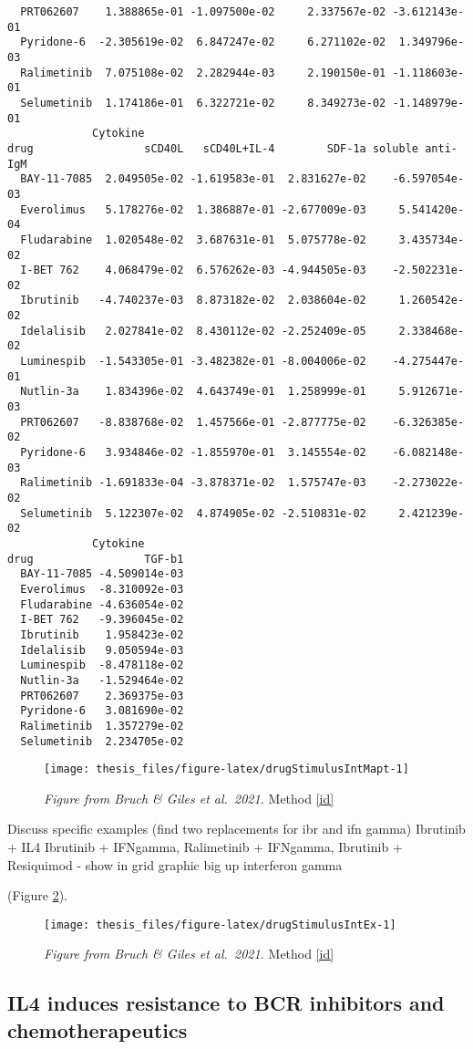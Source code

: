 \documentclass[11pt, a4paper, twosided]{book}
\begin{document}
\begin{verbatim}
  PRT062607    1.388865e-01 -1.097500e-02     2.337567e-02 -3.612143e-01
  Pyridone-6  -2.305619e-02  6.847247e-02     6.271102e-02  1.349796e-03
  Ralimetinib  7.075108e-02  2.282944e-03     2.190150e-01 -1.118603e-01
  Selumetinib  1.174186e-01  6.322721e-02     8.349273e-02 -1.148979e-01
             Cytokine
drug                 sCD40L   sCD40L+IL-4        SDF-1a soluble anti-IgM
  BAY-11-7085  2.049505e-02 -1.619583e-01  2.831627e-02    -6.597054e-03
  Everolimus   5.178276e-02  1.386887e-01 -2.677009e-03     5.541420e-04
  Fludarabine  1.020548e-02  3.687631e-01  5.075778e-02     3.435734e-02
  I-BET 762    4.068479e-02  6.576262e-03 -4.944505e-03    -2.502231e-02
  Ibrutinib   -4.740237e-03  8.873182e-02  2.038604e-02     1.260542e-02
  Idelalisib   2.027841e-02  8.430112e-02 -2.252409e-05     2.338468e-02
  Luminespib  -1.543305e-01 -3.482382e-01 -8.004006e-02    -4.275447e-01
  Nutlin-3a    1.834396e-02  4.643749e-01  1.258999e-01     5.912671e-03
  PRT062607   -8.838768e-02  1.457566e-01 -2.877775e-02    -6.326385e-02
  Pyridone-6   3.934846e-02 -1.855970e-01  3.145554e-02    -6.082148e-03
  Ralimetinib -1.691833e-04 -3.878371e-02  1.575747e-03    -2.273022e-02
  Selumetinib  5.122307e-02  4.874905e-02 -2.510831e-02     2.421239e-02
             Cytokine
drug                 TGF-b1
  BAY-11-7085 -4.509014e-03
  Everolimus  -8.310092e-03
  Fludarabine -4.636054e-02
  I-BET 762   -9.396045e-02
  Ibrutinib    1.958423e-02
  Idelalisib   9.050594e-03
  Luminespib  -8.478118e-02
  Nutlin-3a   -1.529464e-02
  PRT062607    2.369375e-03
  Pyridone-6   3.081690e-02
  Ralimetinib  1.357279e-02
  Selumetinib  2.234705e-02
\end{verbatim}
\begin{figure}

{\centering \texttt{[image: thesis\_files/figure-latex/drugStimulusIntMapt-1]} 

}

\caption{\emph{Figure from Bruch \& Giles et al.~2021.} Method \ref{id}}\label{fig:drugStimulusIntMapt}
\end{figure}
Discuss specific examples
(find two replacements for ibr and ifn gamma)
Ibrutinib + IL4 Ibrutinib + IFNgamma, Ralimetinib + IFNgamma, Ibrutinib + Resiquimod - show in grid graphic
big up interferon gamma

(Figure \ref{fig:drugStimulusIntEx}).


\begin{figure}

{\centering \texttt{[image: thesis\_files/figure-latex/drugStimulusIntEx-1]} 

}

\caption{\emph{Figure from Bruch \& Giles et al.~2021.} Method \ref{id}}\label{fig:drugStimulusIntEx}
\end{figure}
\hypertarget{IL4resistance}{%
\subsection{IL4 induces resistance to BCR inhibitors and chemotherapeutics}\label{IL4resistance}}
\end{document}
